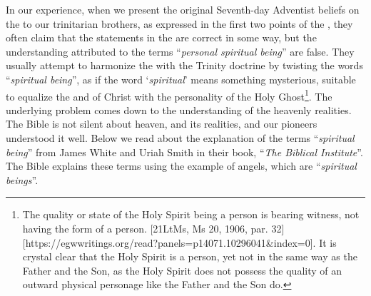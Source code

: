 In our experience, when we present the original Seventh-day Adventist beliefs on the  to our trinitarian brothers, as expressed in the first two points of the , they often claim that the statements in the  are correct in some way, but the understanding attributed to the terms “\textit{personal spiritual being}” are false. They usually attempt to harmonize the  with the Trinity doctrine by twisting the words “\textit{spiritual being}”, as if the word ‘\textit{spiritual}’ means something mysterious, suitable to equalize the  and of Christ with the personality of the Holy Ghost\footnote{The quality or state of the Holy Spirit being a person is bearing witness, not having the form of a person. [21LtMs, Ms 20, 1906, par. 32][https://egwwritings.org/read?panels=p14071.10296041&index=0]. It is crystal clear that the Holy Spirit is a person, yet not in the same way as the Father and the Son, as the Holy Spirit does not possess the quality of an outward physical personage like the Father and the Son do.}. The underlying problem comes down to the understanding of the heavenly realities. The Bible is not silent about heaven, and its realities, and our pioneers understood it well. Below we read about the explanation of the terms “\textit{spiritual being}” from James White and Uriah Smith in their book, “\textit{The Biblical Institute}”. The Bible explains these terms using the example of angels, which are “\textit{spiritual beings}”.



